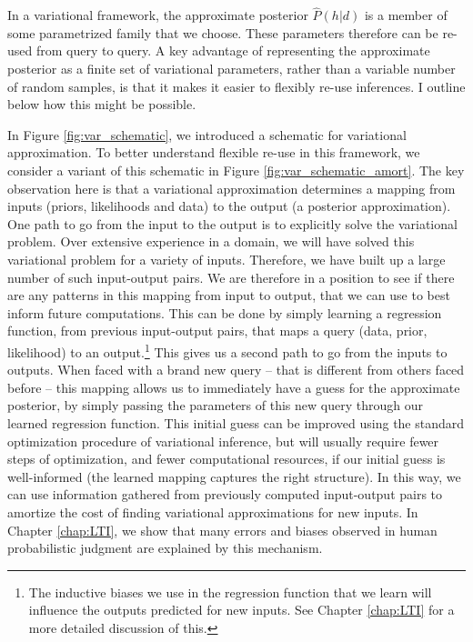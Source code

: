 In a variational framework, the approximate posterior $\hat{P}(h | d)$ is a member of some parametrized family that we choose. These parameters therefore can be re-used from query to query. A key advantage of representing the approximate posterior as a finite set of variational parameters, rather than a variable number of random samples, is that it makes it easier to flexibly re-use inferences. I outline below how this might be possible.

In Figure \ref{fig:var_schematic}, we introduced a schematic for variational approximation. To better understand flexible re-use in this framework, we consider a variant of this schematic in Figure \ref{fig:var_schematic_amort}. The key observation here is that a variational approximation determines a mapping from inputs (priors, likelihoods and data) to the output (a posterior approximation). One path to go from the input to the output is to explicitly solve the variational problem. Over extensive experience in a domain, we will have solved this variational problem for a variety of inputs. Therefore, we have built up a large number of such input-output pairs. We are therefore in a position to see if there are any patterns in this mapping from input to output, that we can use to best inform future computations. This can be done by simply learning a regression function, from previous input-output pairs, that maps a query (data, prior, likelihood) to an output.\footnote{The inductive biases we use in the regression function that we learn will influence the outputs predicted for new inputs. See Chapter \ref{chap:LTI} for a more detailed discussion of this.} This gives us a second path to go from the inputs to outputs. When faced with a brand new query -- that is different from others faced before -- this mapping allows us to immediately have a guess for the approximate posterior, by simply passing the parameters of this new query through our learned regression function. This initial guess can be improved using the standard optimization procedure of variational inference, but will usually require fewer steps of optimization, and fewer computational resources, if our initial guess is well-informed (the learned mapping captures the right structure). In this way, we can use information gathered from previously computed input-output pairs to amortize the cost of finding variational approximations for new inputs. In Chapter \ref{chap:LTI}, we show that many errors and biases observed in human probabilistic judgment are explained by this mechanism.

